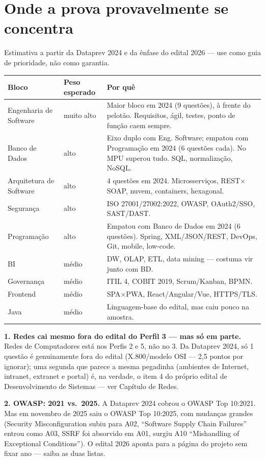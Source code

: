 \section*{Onde a prova provavelmente se concentra}

Estimativa a partir da Dataprev 2024 e da ênfase do edital 2026 --- use como
guia de prioridade, não como garantia.

\begin{center}
\begin{tabular}{@{}p{3.6cm}p{2.8cm}p{6.7cm}@{}}
\toprule
\textbf{Bloco} & \textbf{Peso esperado} & \textbf{Por quê} \\
\midrule
Engenharia de Software & muito alto & Maior bloco em 2024 (9 questões), à frente do pelotão. Requisitos, ágil, testes, ponto de função caem sempre. \\
Banco de Dados & alto & Eixo duplo com Eng. Software; empatou com Programação em 2024 (6 questões cada). No MPU superou tudo. SQL, normalização, NoSQL. \\
Arquitetura de Software & alto & 4 questões em 2024. Microsserviços, REST$\times$SOAP, nuvem, containers, hexagonal. \\
Segurança & alto & ISO 27001/27002:2022, OWASP, OAuth2/SSO, SAST/DAST. \\
Programação & alto & Empatou com Banco de Dados em 2024 (6 questões). Spring, XML/JSON/REST, DevOps, Git, mobile, low-code. \\
BI & médio & DW, OLAP, ETL, data mining --- costuma vir junto com BD. \\
Governança & médio & ITIL 4, COBIT 2019, Scrum/Kanban, BPMN. \\
Frontend & médio & SPA$\times$PWA, React/Angular/Vue, HTTPS/TLS. \\
Java & médio & Linguagem-base do edital, mas caiu pouco na amostra. \\
\bottomrule
\end{tabular}
\end{center}

\begin{pegadinha}
\textbf{1. Redes cai mesmo fora do edital do Perfil 3 --- mas só em parte.}
Redes de Computadores está nos Perfis 2 e 5, não no 3. Da Dataprev 2024, só
1 questão é genuinamente fora do edital (X.800/modelo OSI --- 2,5 pontos por
ignorar); uma segunda que parece a mesma pegadinha (ambientes de Internet,
intranet, extranet e portal) é, na verdade, o item 4 do próprio edital de
Desenvolvimento de Sistemas --- ver Capítulo de Redes.

\textbf{2. OWASP: 2021 vs.\ 2025.} A Dataprev 2024 cobrou o OWASP Top 10:2021.
Mas em novembro de 2025 saiu o OWASP Top 10:2025, com mudanças grandes
(Security Misconfiguration subiu para A02, ``Software Supply Chain Failures''
entrou como A03, SSRF foi absorvido em A01, surgiu A10 ``Mishandling of
Exceptional Conditions''). O edital 2026 aponta para a página do projeto sem
fixar ano --- saiba as duas listas.
\end{pegadinha}

